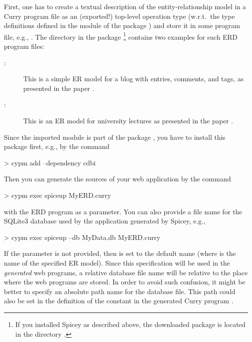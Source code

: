 First, one has to create a textual description of the
entity-relationship model
in a Curry program file as an (exported!) top-level operation type 
(w.r.t.\ the type definitions defined in the module 
of the package )
and store it in some program file, e.g., .
The directory  in the package \footnote{%
If you installed Spicey as described above,
the downloaded  package is located in the directory
.}
contains two examples for such ERD program files:
\begin{description}
\item[:]
This is a simple ER model for a blog with entries, comments,
and tags, as presented in the paper \cite{HanusKoschnicke14TPLP}.
\item[:]
This is an ER model for university lectures as
presented in the paper \cite{BrasselHanusMueller08PADL}.
\end{description}
%
Since the imported module  is part of the package
, you have to install this package first, e.g., by the command
\begin{curry}
> cypm add --dependency cdbi
\end{curry}
Then you can generate the sources of your web application
by the command
\begin{curry}
> cypm exec spiceup MyERD.curry
\end{curry}
with the ERD program as a parameter.
You can also provide a file name for the SQLite3 database used
by the application generated by Spicey, e.g.,
\begin{curry}
> cypm exec spiceup --db MyData.db MyERD.curry
\end{curry}
If the parameter  is not provided,
then  is set to the default name 
(where  is the name of the specified ER model).
Since this specification will be used in the \emph{generated} web programs,
a relative database file name will be relative to the place where
the web programs are stored.
In order to avoid such confusion, it might be better to specify
an absolute path name for the database file.
This path could also be set in the definition of the constant
 in the generated Curry program
.

